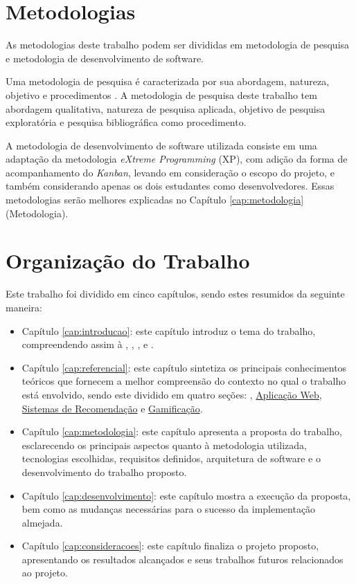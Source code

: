 \section[Metodologias]{Metodologias}
\label{sec:metodologia}

As metodologias deste trabalho podem ser divididas em metodologia de pesquisa e metodologia de desenvolvimento de software.

Uma metodologia de pesquisa é caracterizada por sua abordagem, natureza, objetivo e procedimentos \cite{gerhardt2009metodos}. A metodologia de pesquisa deste trabalho tem abordagem qualitativa, natureza de pesquisa aplicada, objetivo de pesquisa exploratória e pesquisa bibliográfica como procedimento.

A metodologia de desenvolvimento de software utilizada consiste em uma adaptação da metodologia \textit{eXtreme Programming} (XP), com adição da forma de acompanhamento do \textit{Kanban}, levando em consideração o escopo do projeto, e também considerando apenas os dois estudantes como desenvolvedores. Essas metodologias serão melhores explicadas no Capítulo \ref{cap:metodologia} (Metodologia).

\section[Organização do Trabalho]{Organização do Trabalho}
\label{sec:organizacao}
Este trabalho foi dividido em cinco capítulos, sendo estes resumidos da seguinte maneira:

\begin{itemize}
    \item Capítulo \ref{cap:introducao}: este capítulo introduz o tema do trabalho, compreendendo assim à , , ,  e .

    \item Capítulo \ref{cap:referencial}: este capítulo sintetiza os principais conhecimentos teóricos que fornecem a melhor compreensão do contexto no qual o trabalho está envolvido, sendo este dividido em quatro seções: , \hyperref[sec:aw]{Aplicação Web}, \hyperref[sec:recomendação]{Sistemas de Recomendação} e \hyperref[sec:gamificacao]{Gamificação}.

    \item Capítulo \ref{cap:metodologia}: este capítulo apresenta a proposta do trabalho, esclarecendo os principais aspectos quanto à metodologia utilizada, tecnologias escolhidas, requisitos definidos, arquitetura de software e o desenvolvimento do trabalho proposto.
    
    \item Capítulo \ref{cap:desenvolvimento}: este capítulo mostra a execução da proposta, bem como as mudanças necessárias para o sucesso da implementação almejada.

    \item Capítulo \ref{cap:consideracoes}: este capítulo finaliza o projeto proposto, apresentando os resultados alcançados e seus trabalhos futuros relacionados ao projeto.
\end{itemize}